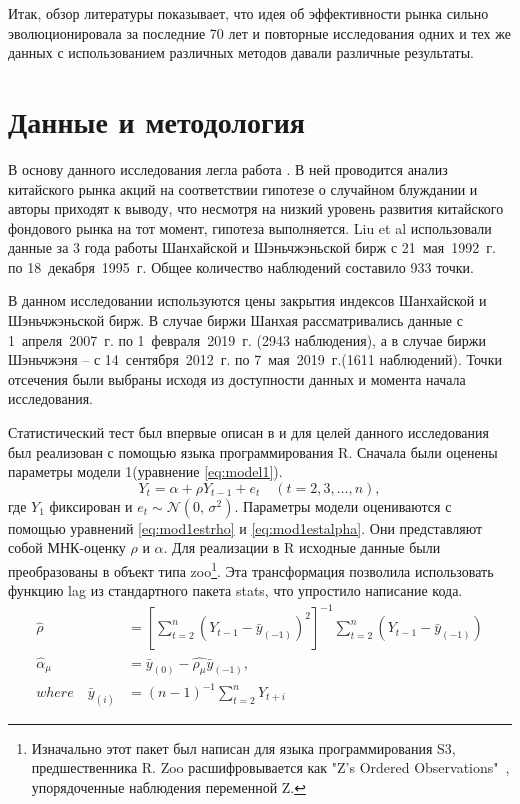 \documentclass[a4paper,12pt]{article}
\begin{document}
Итак, обзор литературы показывает, что идея об эффективности рынка сильно эволюционировала за последние 70 лет и повторные исследования одних и тех же данных с использованием различных методов давали различные результаты.

\newpage
\section{Данные и методология}

В основу данного исследования легла работа \cite{Liu1997}. В ней проводится анализ китайского рынка акций на соответствии гипотезе о случайном блуждании и авторы приходят к выводу, что несмотря на низкий уровень развития китайского фондового рынка на тот момент, гипотеза выполняется. Liu et al использовали данные за 3 года работы Шанхайской и Шэньчжэньской бирж с 21~мая~1992~г. по 18~декабря~1995~г. Общее количество наблюдений составило 933 точки.

В данном исследовании используются цены закрытия индексов Шанхайской и Шэньчжэньской бирж. В случае биржи Шанхая рассматривались данные с 1~апреля~2007~г. по 1~февраля~2019~г. (2943 наблюдения), а в случае биржи Шэньчжэня -- с 14~сентября~2012~г. по 7~мая~2019~г.(1611 наблюдений). Точки отсечения были выбраны исходя из доступности данных и момента начала исследования.

Статистический тест был впервые описан в \cite{Dickey1981} и для целей данного исследования был реализован с помощью языка программирования R. Сначала были оценены параметры модели 1(уравнение \ref{eq:model1}).
\begin{equation}
  Y_t=\alpha+\rho Y_{t-1}+e_t\quad (t=2,3,\ldots,n),
\label{eq:model1}
\end{equation}
где $Y_1$ фиксирован и $e_t \sim \mathcal{N}(0,\,\sigma^{2})$. Параметры модели оцениваются с помощью уравнений \ref{eq:mod1estrho} и \ref{eq:mod1estalpha}. Они представляют собой МНК-оценку $\rho$ и $\alpha$. Для реализации в R исходные данные были преобразованы в объект типа zoo\footnote{Изначально этот пакет был написан для языка программирования S3, предшественника R. Zoo расшифровывается как "Z's Ordered Observations"\ , упорядоченные наблюдения переменной Z.}. Эта трансформация позволила использовать функцию lag из стандартного пакета stats, что упростило написание кода.
\begin{align}
  \label{eq:mod1estrho}
  \hat{\rho}&=\left[\sum_{t=2}^n (Y_{t-1}-\bar{y}_{(-1)})^2\right]^{-1}
  \sum_{t=2}^n \left(Y_{t-1}-\bar{y}_{(-1)}\right)\\
  \label{eq:mod1estalpha}
  \hat{\alpha}_\mu&=\bar{y}_{(0)}-\hat{\rho_\mu}\bar{y}_{(-1)},\\
where\quad
  \bar{y}_{(i)}&=(n-1)^{-1}\sum_{t=2}^{n}Y_{t+i}
\end{align}
\end{document}
